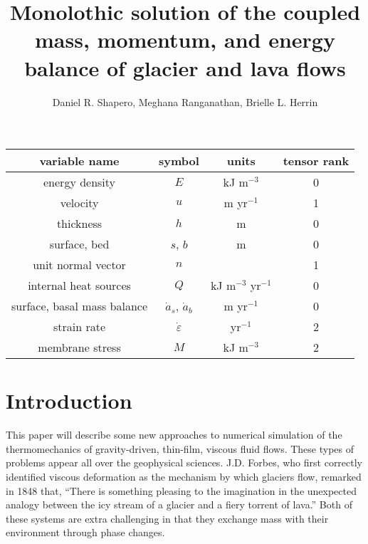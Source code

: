 \documentclass{article}
\title{Monolothic solution of the coupled mass, momentum, and energy balance of glacier and lava flows}
\author{Daniel R. Shapero, Meghana Ranganathan, Brielle L. Herrin}
\date{}
\theoremstyle{definition}
\theoremstyle{plain}
\begin{document}
\maketitle

\begin{center}
\begin{tabular}{|c|c|c|c|}
    \hline
    variable name & symbol & units & tensor rank \\
    \hline
    energy density & $E$ & kJ m${}^{-3}$ & 0 \\
    velocity & $u$ & m yr${}^{-1}$ & 1 \\
    thickness & $h$ & m & 0 \\
    surface, bed & $s$, $b$ & m & 0 \\
    unit normal vector & $n$ & & 1 \\
    internal heat sources & $Q$ & kJ m${}^{-3}$ yr${}^{-1}$ & 0 \\
    surface, basal mass balance & $\dot a_s$, $\dot a_b$ & m yr${}^{-1}$ & 0 \\
    strain rate & $\dot\varepsilon$ & yr${}^{-1}$ & 2 \\
    membrane stress & $M$ & kJ m${}^{-3}$ & 2 \\
    \hline
\end{tabular}
\end{center}


\section{Introduction}

This paper will describe some new approaches to numerical simulation of the thermomechanics of gravity-driven, thin-film, viscous fluid flows.
These types of problems appear all over the geophysical sciences.
J.D. Forbes, who first correctly identified viscous deformation as the mechanism by which glaciers flow, remarked in 1848 that, ``There is something pleasing to the imagination in the unexpected analogy between the icy stream of a glacier and a fiery torrent of lava.''
Both of these systems are extra challenging in that they exchange mass with their environment through phase changes.
\end{document}
